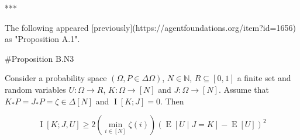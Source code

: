 \documentclass[a4paper]{article}
\newcommand{\E}[1]{\underset{#1}{\operatorname{E}}}
\newcommand{\I}[1]{\underset{#1}{\operatorname{I}}}
\newcommand{\Nats}{\mathbb{N}}
\newcommand{\J}{J}
\begin{document}
***

The following appeared [previously](https://agentfoundations.org/item?id=1656) as "Proposition A.1".

\#Proposition B.N3

Consider a probability space $(\Omega, P \in \Delta\Omega)$, $N \in \Nats$, $R \subseteq [0,1]$ a finite set and random variables $U: \Omega \rightarrow R$, $K: \Omega \rightarrow [N]$ and $\J: \Omega \rightarrow [N]$. Assume that $K_*P = J_*P = \zeta \in \Delta[N]$ and $\I{}[K;J] = 0$. Then

$$\I{}\left[K;J,U\right] \geq 2 \left(\min_{i \in [N]} {\zeta(i)}\right) \left(\E{}\left[U \mid J = K\right]-\E{}\left[U\right]\right)^2$$
\end{document}
